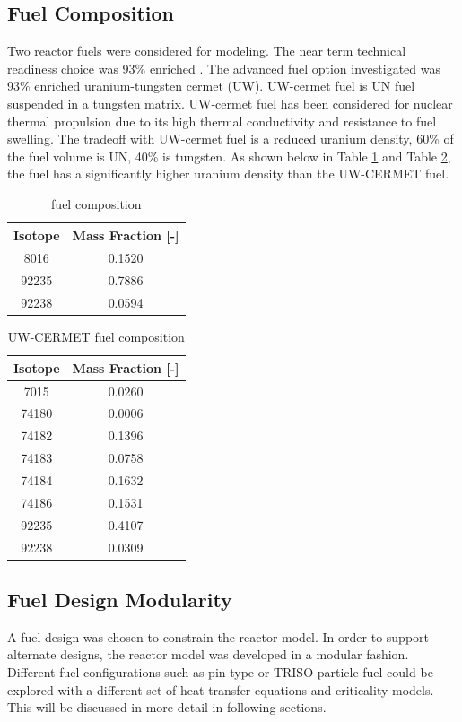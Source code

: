 \subsection{Fuel Composition}
Two reactor fuels were considered for modeling. The near term technical
readiness choice was 93\% enriched \uox. The advanced fuel option investigated
was 93\% enriched uranium-tungsten cermet (UW). UW-cermet fuel is UN fuel suspended in a
tungsten matrix. UW-cermet fuel has been considered for nuclear thermal
propulsion due to its high thermal conductivity and resistance to fuel swelling.
The tradeoff with UW-cermet fuel is a reduced uranium density, 60\% of the fuel
volume is UN, 40\% is tungsten. As shown below in Table \ref{tab:uox_comp} and
Table \ref{tab:uw_comp}, the \uox fuel has a significantly higher uranium
density than the UW-CERMET fuel.

\begin{table}[h]
  \centering
  \caption{\uox fuel composition}
  \begin{tabular}{cc}
    \toprule
    Isotope   & Mass Fraction [-] \\
    \midrule
     8016     & 0.1520 \\
    92235     & 0.7886 \\
    92238     & 0.0594 \\
  \end{tabular}
  \label{tab:uox_comp}
\end{table}
    
\begin{table}[h]
  \centering
  \caption{UW-CERMET fuel composition}
  \begin{tabular}{cc}
    \toprule
    Isotope   & Mass Fraction [-] \\
    \midrule
     7015     &  0.0260 \\
     74180    &  0.0006 \\ 
     74182    &  0.1396 \\
     74183    &  0.0758 \\
     74184    &  0.1632 \\
     74186    &  0.1531 \\
     92235    &  0.4107 \\
     92238    &  0.0309 \\
  \end{tabular}
  \label{tab:uw_comp}
\end{table}

\newpage

\subsection{Fuel Design Modularity}
A fuel design was chosen to constrain the reactor model. In order to support
alternate designs, the reactor model was developed in a modular fashion.
Different fuel configurations such as pin-type or TRISO particle fuel could be
explored with a different set of heat transfer equations and criticality models.
This will be discussed in more detail in following sections.


